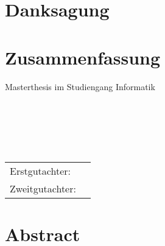 \chapter*{Danksagung}
\thispagestyle{empty}

\blankpage


\chapter*{Zusammenfassung}
\begin{center}
    \vspace{-2ex}
    \SingleSpacing
    Masterthesis im Studiengang Informatik\\
    \theInstitut\\
    \theFaculty\\
    \ \\
    \theauthor\\
    \ \\
    \textbf{\thetitle}
\end{center}



\vfill

\begin{tabular}{ll}
	    Erstgutachter: & \theSupervisor \\
		Zweitgutachter: & \theSecSupervisor\\
\end{tabular} \par
\chapter*{Abstract}

